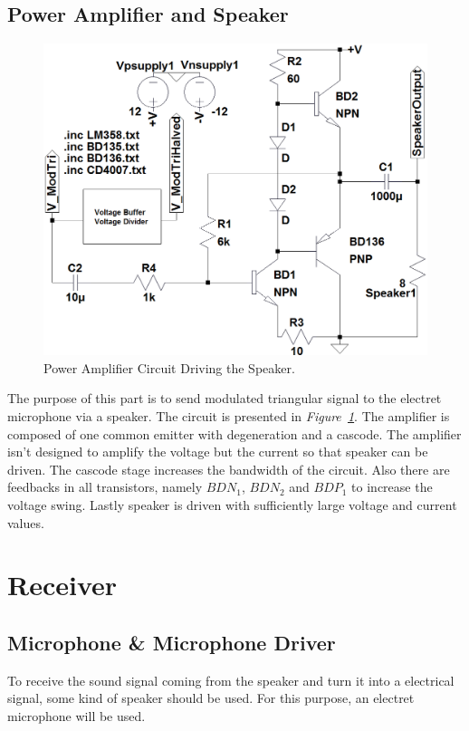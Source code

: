\documentclass[paper]{IEEEtran}
\begin{document}
\subsection{Power Amplifier and Speaker}
\begin{figure}[h!]
 \setlength{\unitlength}{\textwidth}
 \center 
 \includegraphics[width=0.45\unitlength]{PowerAmp_Circuit}
 \caption{\label{fig:PowerAmp_Circuit}Power Amplifier Circuit Driving the Speaker.}
\end{figure}
The purpose of this part is to send modulated triangular signal to the electret microphone via a speaker. The circuit is presented in \textit{Figure~\ref{fig:PowerAmp_Circuit}}. The amplifier is composed of one common emitter with degeneration and a cascode. The amplifier isn't designed to amplify the voltage but the current so that speaker can be driven. The cascode stage increases the bandwidth of the circuit. Also there are feedbacks in all transistors, namely $BDN_{1}$, $BDN_{2}$ and $BDP_{1}$ to increase the voltage swing. Lastly speaker is driven with sufficiently large voltage and current values.





\section{Receiver}

\subsection{Microphone \& Microphone Driver}
	To receive the sound signal coming from the speaker and turn it into a electrical signal, some kind of speaker should be used. For this purpose, an electret microphone will be used. 
	
\end{document}
